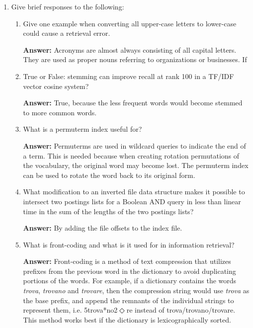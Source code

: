 \documentclass[11pt]{article}
\begin{document}
\begin{enumerate}
\begin{enumerate}
        \end{enumerate}

  \item Give brief responses to the following:
        \begin{enumerate}
          \item Give one example when converting all upper-case letters to lower-case could cause a retrieval error.

                \textbf{Answer:} Acronyms are almost always consisting of all capital letters. They are used as proper nouns referring to organizations or businesses. If

          \item True or False: stemming can improve recall at rank 100 in a TF/IDF vector cosine system?

                \textbf{Answer:} True, because the less frequent words would become stemmed to more common words.

          \item What is a permuterm index useful for?

                \textbf{Answer:} Permuterms are used in wildcard queries to indicate the end of a term. This is needed because when creating rotation permutations of the vocabulary, the original word may become lost. The permuterm index can be used to rotate the word back to its original form.

          \item What modification to an inverted file data structure makes it possible to intersect two postings lists for a Boolean AND query in less than linear time in the sum of the lengths of the two postings lists?

                \textbf{Answer:} By adding the file offsets to the index file.

          \item What is front-coding and what is it used for in information retrieval?

                \textbf{Answer:} Front-coding is a method of text compression that utilizes prefixes from the previous word in the dictionary to avoid duplicating portions of the words. For example, if a dictionary contains the words \textit{trova}, \textit{trovano} and \textit{trovare}, then the compression string would use \textit{trova} as the base prefix, and append the remnants of the individual strings to represent them, i.e. 5trova*no2$\Diamond$re instead of trova/trovano/trovare. This method works best if the dictionary is lexicographically sorted.


\end{enumerate}
\end{enumerate}
\end{document}
